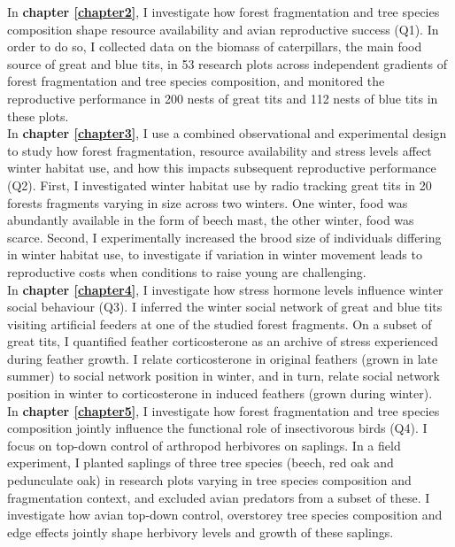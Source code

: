 \documentclass[10pt, twoside]{book} %
\begin{document}
In \textbf{chapter \ref{chapter2}}, I investigate how forest fragmentation and tree species composition shape resource availability and avian reproductive success (Q1). In order to do so, I collected data on the biomass of caterpillars, the main food source of great and blue tits, in 53 research plots across independent gradients of forest fragmentation and tree species composition, and monitored the reproductive performance in 200 nests of great tits and 112 nests of blue tits in these plots.\\

In \textbf{chapter \ref{chapter3}}, I use a combined observational and experimental design to study how forest fragmentation, resource availability and stress levels affect winter habitat use, and how this impacts subsequent reproductive performance (Q2). First, I investigated winter habitat use by radio tracking great tits in 20 forests fragments varying in size across two winters. One winter, food was abundantly available in the form of beech mast, the other winter, food was scarce. Second, I experimentally increased the brood size of individuals differing in winter habitat use, to investigate if variation in winter movement leads to reproductive costs when conditions to raise young are challenging.\\

In \textbf{chapter \ref{chapter4}}, I investigate how stress hormone levels influence winter social behaviour (Q3). I inferred the winter social network of great and blue tits visiting artificial feeders at one of the studied forest fragments. On a subset of great tits, I quantified feather corticosterone as an archive of stress experienced during feather growth. I relate corticosterone in original feathers (grown in late summer) to social network position in winter, and in turn, relate social network position in winter to corticosterone in induced feathers (grown during winter).\\
 
In \textbf{chapter \ref{chapter5}}, I investigate how forest fragmentation and tree species composition jointly influence the functional role of insectivorous birds (Q4). I focus on top-down control of arthropod herbivores on saplings. In a field experiment, I planted saplings of three tree species (beech, red oak and pedunculate oak) in research plots varying in tree species composition and fragmentation context, and excluded avian predators from a subset of these. I investigate how avian top-down control, overstorey tree species composition and edge effects jointly shape herbivory levels and growth of these saplings.\\
\end{document}

